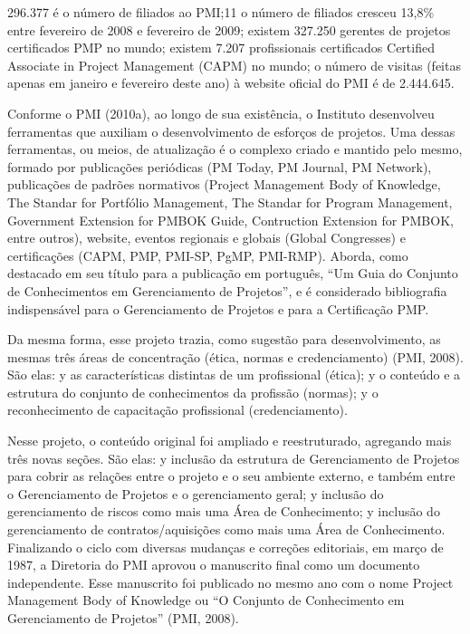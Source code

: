 296.377 é o número de filiados ao PMI;11
o número de filiados cresceu 13,8\% entre fevereiro de 2008 e fevereiro de 2009;
existem 327.250 gerentes de projetos certificados PMP no mundo;
existem 7.207 profissionais certificados Certified Associate in Project Management (CAPM) no mundo;
o número de visitas (feitas apenas em janeiro e fevereiro deste ano) à website
oficial do PMI é de 2.444.645.

Conforme o PMI (2010a), ao longo de sua existência, o Instituto desenvolveu ferramentas que auxiliam o desenvolvimento de esforços de projetos. Uma dessas ferramentas, ou meios, de atualização é o complexo criado e mantido pelo mesmo, formado por publicações periódicas (PM Today, PM Journal, PM Network), publicações de padrões normativos (Project Management Body of Knowledge, The Standar for Portfólio Management, The Standar for Program Management, Government Extension for PMBOK Guide, Contruction Extension for PMBOK, entre outros), website, eventos regionais e globais (Global Congresses) e certificações (CAPM, PMP, PMI-SP, PgMP, PMI-RMP).
Aborda, como destacado em seu título para a publicação em português, “Um Guia do Conjunto de Conhecimentos em Gerenciamento de Projetos”, e é considerado bibliografia indispensável para o Gerenciamento de Projetos e para a Certificação PMP.

Da mesma forma, esse projeto trazia, como sugestão para desenvolvimento, as mesmas três áreas de concentração (ética, normas e credenciamento) (PMI, 2008). São elas:
y as características distintas de um profissional (ética);
y o conteúdo e a estrutura do conjunto de conhecimentos da profissão (normas);
y o reconhecimento de capacitação profissional (credenciamento).

Nesse projeto, o conteúdo original foi ampliado e reestruturado, agregando mais três
novas seções. São elas:
y inclusão da estrutura de Gerenciamento de Projetos para cobrir as relações entre o projeto e o seu ambiente externo, e também entre o Gerenciamento de Projetos e o gerenciamento geral;
y inclusão do gerenciamento de riscos como mais uma Área de Conhecimento;
y inclusão do gerenciamento de contratos/aquisições como mais uma Área de
Conhecimento.
Finalizando o ciclo com diversas mudanças e correções editoriais, em março de
1987, a Diretoria do PMI aprovou o manuscrito final como um documento
independente. Esse manuscrito foi publicado no mesmo ano com o nome Project
Management Body of Knowledge ou “O Conjunto de Conhecimento em
Gerenciamento de Projetos” (PMI, 2008).

